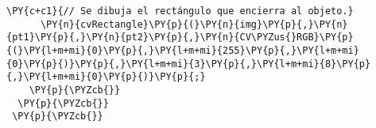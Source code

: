 \begin{Verbatim}[commandchars=\\\{\}]
      \PY{c+c1}{// Se dibuja el rectángulo que encierra al objeto.}
      \PY{n}{cvRectangle}\PY{p}{(}\PY{n}{img}\PY{p}{,}\PY{n}{pt1}\PY{p}{,}\PY{n}{pt2}\PY{p}{,}\PY{n}{CV\PYZus{}RGB}\PY{p}{(}\PY{l+m+mi}{0}\PY{p}{,}\PY{l+m+mi}{255}\PY{p}{,}\PY{l+m+mi}{0}\PY{p}{)}\PY{p}{,}\PY{l+m+mi}{3}\PY{p}{,}\PY{l+m+mi}{8}\PY{p}{,}\PY{l+m+mi}{0}\PY{p}{)}\PY{p}{;}
    \PY{p}{\PYZcb{}}
  \PY{p}{\PYZcb{}}
 \PY{p}{\PYZcb{}}
\end{Verbatim}
